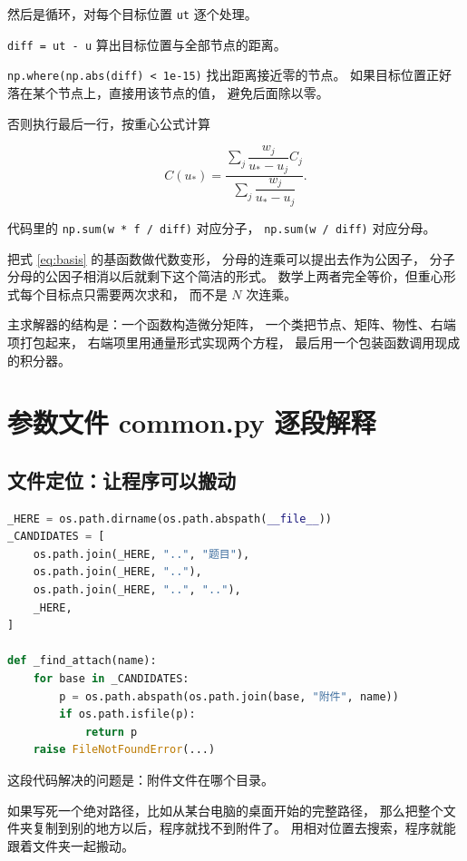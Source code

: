 然后是循环，对每个目标位置 \texttt{ut} 逐个处理。

\texttt{diff = ut - u} 算出目标位置与全部节点的距离。

\texttt{np.where(np.abs(diff) < 1e-15)} 找出距离接近零的节点。
如果目标位置正好落在某个节点上，直接用该节点的值，
避免后面除以零。

否则执行最后一行，按重心公式计算

\begin{equation}
C(u_*) = \frac{\sum_j \dfrac{w_j}{u_*-u_j}C_j}{\sum_j \dfrac{w_j}{u_*-u_j}} .
\end{equation}

代码里的 \texttt{np.sum(w * f / diff)} 对应分子，
\texttt{np.sum(w / diff)} 对应分母。

把式 \eqref{eq:basis} 的基函数做代数变形，
分母的连乘可以提出去作为公因子，
分子分母的公因子相消以后就剩下这个简洁的形式。
数学上两者完全等价，但重心形式每个目标点只需要两次求和，
而不是 $N$ 次连乘。

\keypoint
主求解器的结构是：一个函数构造微分矩阵，
一个类把节点、矩阵、物性、右端项打包起来，
右端项里用通量形式实现两个方程，
最后用一个包装函数调用现成的积分器。

\section{参数文件 common.py 逐段解释}

\subsection{文件定位：让程序可以搬动}

\begin{lstlisting}[language=Python]
_HERE = os.path.dirname(os.path.abspath(__file__))
_CANDIDATES = [
    os.path.join(_HERE, "..", "题目"),
    os.path.join(_HERE, ".."),
    os.path.join(_HERE, "..", ".."),
    _HERE,
]

def _find_attach(name):
    for base in _CANDIDATES:
        p = os.path.abspath(os.path.join(base, "附件", name))
        if os.path.isfile(p):
            return p
    raise FileNotFoundError(...)
\end{lstlisting}

这段代码解决的问题是：附件文件在哪个目录。

如果写死一个绝对路径，比如从某台电脑的桌面开始的完整路径，
那么把整个文件夹复制到别的地方以后，程序就找不到附件了。
用相对位置去搜索，程序就能跟着文件夹一起搬动。

